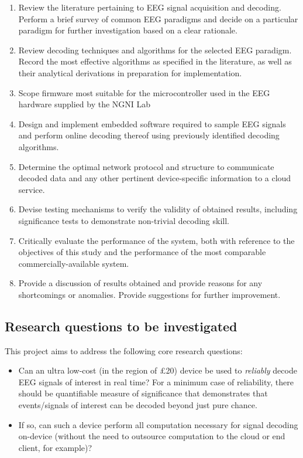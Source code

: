 \begin{enumerate}
    \item Review the literature pertaining to EEG signal acquisition and decoding. Perform a brief survey of common EEG paradigms and decide on a particular paradigm for further investigation based on a clear rationale. 
    \item Review decoding techniques and algorithms for the selected EEG paradigm. Record the most effective algorithms as specified in the literature, as well as their analytical derivations in preparation for implementation. 
    \item Scope firmware most suitable for the microcontroller used in the EEG hardware supplied by the NGNI Lab
    \item Design and implement embedded software required to sample EEG signals and perform online decoding thereof using previously identified decoding algorithms.
    \item Determine the optimal network protocol and structure to communicate decoded data and any other pertinent device-specific information to a cloud service.
    \item Devise testing mechanisms to verify the validity of obtained results, including significance tests to demonstrate non-trivial decoding skill.
    \item Critically evaluate the performance of the system, both with reference to the objectives of this study and the performance of the most comparable commercially-available system.
    \item Provide a discussion of results obtained and provide reasons for any shortcomings or anomalies. Provide suggestions for further improvement.
    
\end{enumerate}

\subsection{Research questions to be investigated}
This project aims to address the following core research questions: 
\begin{itemize}
    \item Can an ultra low-cost (in the region of £20) device be used to \textit{reliably} decode EEG signals of interest in real time? For a minimum case of reliability, there should be quantifiable measure of significance that demonstrates that events/signals of interest can be decoded beyond just pure chance. 
    \item If so, can such a device perform all computation necessary for signal decoding on-device (without the need to outsource computation to the cloud or end client, for example)? 
\end{itemize}
